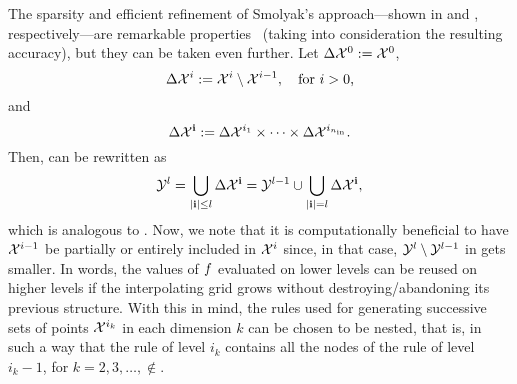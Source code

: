 The sparsity and efficient refinement of Smolyak's approach---shown in
 and , respectively---are
remarkable properties \perse\ (taking into consideration the resulting
accuracy), but they can be taken even further. Let $\Delta\mathcal{X}^0 := \mathcal{X}^0$,
\[
  \Delta\mathcal{X}^i := \mathcal{X}^i \setminus \mathcal{X}^{i - 1}, \quad \text{for $i > 0$,}
\]
and
\[
  \Delta\mathcal{X}^{\mathbf{i}} := \Delta\mathcal{X}^{i_1} \times \cdots \times \Delta\mathcal{X}^{i_{n_\text{in}}}.
\]
Then,  can be rewritten as
\begin{equation} \elab{smolyak-grid-incremental}
  \Y^l = \bigcup_{|\vi| \leq l} \Delta\X^\vi = \Y^{l - 1} \cup \bigcup_{|\vi| = l} \Delta\X^\vi,
\end{equation}
which is analogous to . Now, we note that it is
computationally beneficial to have $\mathcal{X}^{i - 1}$ be partially or entirely
included in $\mathcal{X}^i$ since, in that case, $\mathcal{Y}^l \setminus \mathcal{Y}^{l - 1}$ in
 gets smaller. In words, the values of $f$
evaluated on lower levels can be reused on higher levels if the interpolating
grid grows without destroying/abandoning its previous structure. With this in
mind, the rules used for generating successive sets of points $\mathcal{X}^{i_k}$ in each
dimension $k$ can be chosen to be nested, that is, in such a way that the rule
of level $i_k$ contains all the nodes of the rule of level $i_k - 1$, for $k =
2, 3, \dots, \nin$.

